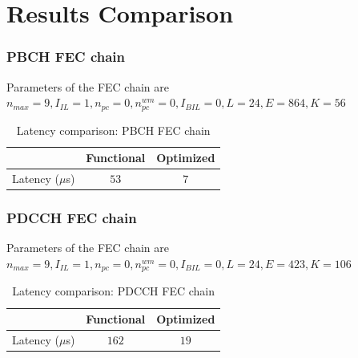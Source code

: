 \section{Results Comparison}

\subsubsection{PBCH FEC chain}
Parameters of the FEC chain are \newline
$n_{max} = 9, I_{IL} = 1, n_{pc} = 0, n_{pc}^{wm} = 0, I_{BIL} = 0, L = 24, E = 864, K = 56$
\begin{table}[!h]
	\begin{center}
		\caption{Latency comparison: PBCH FEC chain}
		\label{tab:pbchFecChain}
		\begin{tabular}{c|c|c} %
			\textbf{ } & Functional & Optimized \\
			\hline
			Latency ($\mu$s) & $53$ & $7$\\
		\end{tabular}
	\end{center}
\end{table}

\subsubsection{PDCCH FEC chain} 
Parameters of the FEC chain are \newline
$n_{max} = 9, I_{IL} = 1, n_{pc} = 0, n_{pc}^{wm} = 0, I_{BIL} = 0, L = 24, E = 423, K = 106$
\begin{table}[!h]
	\begin{center}
		\caption{Latency comparison: PDCCH FEC chain}
		\label{tab:pdcchFecChain}
		\begin{tabular}{c|c|c} %
			\textbf{ } & Functional & Optimized \\
			\hline
			Latency ($\mu$s) & $162$ & $19$\\
		\end{tabular}
	\end{center}
\end{table}



